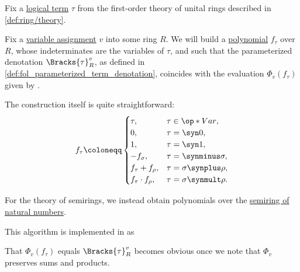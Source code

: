 \begin{algorithm}\label{alg:logical_term_to_integer_polynomial}
  Fix a \hyperref[def:fol_term]{logical term} \( \tau \) from the first-order theory of unital rings described in \cref{def:ring/theory}.

  Fix a \hyperref[def:fol_variable_assignment]{variable assignment} \( v \) into some ring \( R \). We will build a \hyperref[def:polynomial_algebra/polynomials]{polynomial} \( f_\tau \) over \( R \), whose indeterminates are the variables of \( \tau \), and such that the parameterized denotation \( \Bracks{ \tau }_R^v \), as defined in \cref{def:fol_parameterized_term_denotation}, coincides with the evaluation \( \Phi_v(f_\tau) \) given by .

  The construction itself is quite straightforward:
  \begin{equation}\label{eq:alg:logical_term_to_integer_polynomial}
    f_\tau \coloneqq \begin{cases}
      \tau,                &\tau \in \op*{Var},          \\
      0,                   &\tau = \syn0,                \\
      1,                   &\tau = \syn1,                \\
      -f_\sigma,           &\tau = \synminus \sigma,     \\
      f_\tau + f_\rho,     &\tau = \sigma \synplus \rho, \\
      f_\tau \cdot f_\rho, &\tau = \sigma \synmult \rho.
    \end{cases}
  \end{equation}
\end{algorithm}
\begin{comments}
  \item For the theory of semirings, we instead obtain polynomials over the \hyperref[def:natural_numbers]{semiring of natural numbers}.
  \item This algorithm is implemented in \cite{notebook:code} as
  \begin{CodeRefDisplay}
  \end{CodeRefDisplay}
\end{comments}
\begin{defproof}
  That \( \Phi_v(f_\tau) \) equals \( \Bracks{ \tau }_R^v \) becomes obvious once we note that \( \Phi_v \) preserves sums and products.
\end{defproof}

